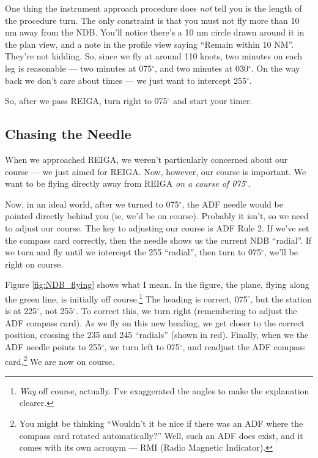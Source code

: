 One thing the instrument approach procedure does \emph{not} tell you
is the length of the procedure turn.  The only constraint is that you
must not fly more than 10 nm away from the NDB.  You'll notice there's
a 10 nm circle drawn around it in the plan view, and a note in the
profile view saying ``Remain within 10 NM''.  They're not kidding.
So, since we fly at around 110 knots, two minutes on each leg is
reasonable --- two minutes at 075$^\circ$, and two minutes at
030$^\circ$.  On the way back we don't care about times --- we just
want to intercept 255$^\circ$.

So, after we pass REIGA, turn right to 075$^\circ$ and start your
timer.

\subsection{Chasing the Needle}


When we approached REIGA, we weren't particularly concerned about our
course --- we just aimed for REIGA.  Now, however, our course is
important.  We want to be flying directly away from REIGA \emph{on a
  course of 075$^\circ$}.

Now, in an ideal world, after we turned to 075$^\circ$, the ADF needle
would be pointed directly behind you (ie, we'd be on course).
Probably it isn't, so we need to adjust our course.  The key to
adjusting our course is ADF Rule 2.  If we've set the compass card
correctly, then the needle shows us the current NDB ``radial''.  If we
turn and fly until we intercept the 255 ``radial'', then turn to
075$^\circ$, we'll be right on course.

Figure \ref{fig:NDB_flying} shows what I mean.  In the figure, the
plane, flying along the green line, is initially off
course.\footnote{\emph{Way} off course, actually.  I've exaggerated
  the angles to make the explanation clearer.}  The heading is
correct, 075$^\circ$, but the station is at 225$^\circ$, not
255$^\circ$.  To correct this, we turn right (remembering to adjust
the ADF compass card).  As we fly on this new heading, we get closer
to the correct position, crossing the 235 and 245 ``radials'' (shown
in red).  Finally, when we the ADF needle points to 255$^\circ$, we
turn left to 075$^\circ$, and readjust the ADF compass
card.\footnote{You might be thinking ``Wouldn't it be nice if there
  was an ADF where the compass card rotated automatically?''  Well,
  such an ADF does exist, and it comes with its own acronym --- RMI
  (Radio Magnetic Indicator).} We are now on course.

